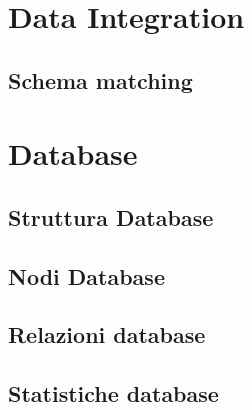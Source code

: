 \documentclass[
10pt, %
a4paper, %
oneside, %
headinclude,footinclude, %
BCOR5mm, %
]{scrartcl}
\begin{document}
\section{Data Integration}
\subsection{Schema matching}
\section{Database}
\subsection{Struttura Database}
\subsection{Nodi Database}
\subsection{Relazioni database}
\subsection{Statistiche database}




\renewcommand{\refname}{\spacedlowsmallcaps{References}} %




\end{document}
